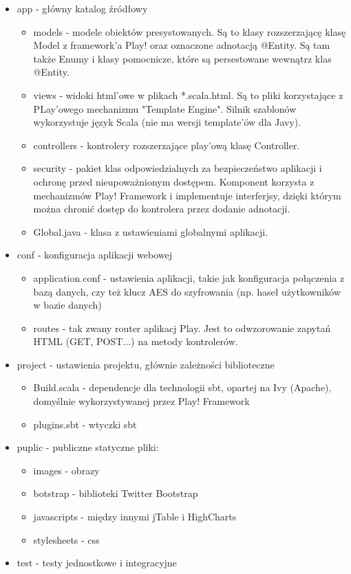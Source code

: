 \documentclass[a4paper,12pt,notitlepage]{mwrep}
\begin{document}
\begin{itemize}
	\item	app - główny katalog źródłowy	
		\begin{itemize}
			\item	models - modele obiektów presystowanych. Są to klasy rozszerzającę klasę Model z framework'a
				Play! oraz oznaczone adnotacją @Entity. Są tam także Enumy i klasy pomocnicze, które są 
				persestowane wewnątrz klas @Entity.
			\item	views - widoki html'owe w plikach *.scala.html. Są to pliki korzystające z PLay'owego mechanizmu 
				"Template Engine". Silnik szablonów wykorzystuje język Scala (nie ma wersji template'ów dla Javy).
			\item	controllers - kontrolery rozszerzające play'ową klasę Controller.
			\item	security - pakiet klas odpowiedzialnych za bezpieczeństwo aplikacji i ochronę przed 
				nieupoważnionym dostępem. Komponent korzysta z mechanizmów Play! Framework i implementuje interferjsy, 
				dzięki którym można chronić dostęp do kontrolera przez dodanie adnotacji.
			\item	Global.java - klasa z ustawieniami globalnymi aplikacji.	
		\end{itemize}
	\item	conf - konfiguracja aplikacji webowej
		\begin{itemize}
			\item	application.conf - ustawienia aplikacji, takie jak konfiguracja połączenia z bazą danych, 
				czy też klucz AES do szyfrowania (np. haseł użytkowników w bazie danych)
			\item	routes - tak zwany router aplikacj Play. Jest to odwzorowanie zapytań HTML (GET, POST...) 
				na metody kontrolerów.		
		\end{itemize}
	\item	project - ustawienia projektu, głównie zależności biblioteczne
		\begin{itemize}
			\item	Build.scala - dependencje dla technologii sbt, opartej na Ivy (Apache), domyślnie wykorzystywanej 
				przez Play! Framework
			\item	plugins.sbt - wtyczki sbt
		\end{itemize}
	\item	puplic - publiczne statyczne pliki:
		\begin{itemize}
			\item	images - obrazy
			\item	botstrap - biblioteki Twitter Bootstrap
			\item	javascripts - między innymi jTable i HighCharts
			\item	stylesheets - css
		\end{itemize}
	\item	test - testy jednostkowe i integracyjne
\end{itemize}
\end{document}

